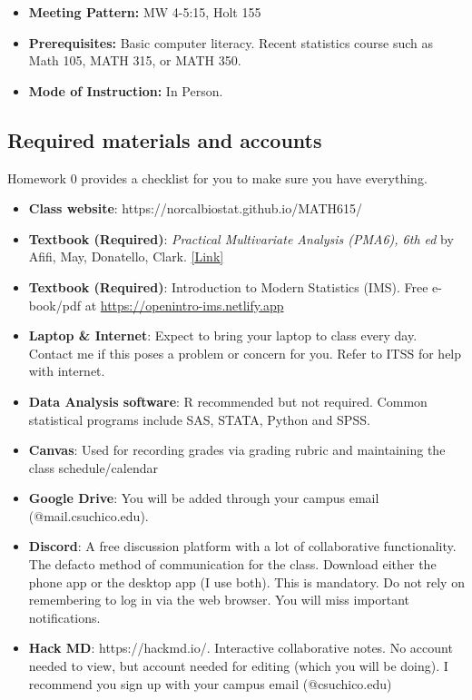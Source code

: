 \documentclass[
  letterpaper,
  DIV=11,
  numbers=noendperiod]{scrartcl}
\providecommand{\tightlist}{%
  \setlength{\itemsep}{0pt}\setlength{\parskip}{0pt}}\usepackage{longtable,booktabs,array}
\begin{document}
\begin{itemize}
\tightlist
\item
  \textbf{Meeting Pattern:} MW 4-5:15, Holt 155
\item
  \textbf{Prerequisites:} Basic computer literacy. Recent statistics
  course such as Math 105, MATH 315, or MATH 350.
\item
  \textbf{Mode of Instruction:} In Person.
\end{itemize}

\hypertarget{required-materials-and-accounts}{%
\subsection{Required materials and
accounts}\label{required-materials-and-accounts}}

Homework 0 provides a checklist for you to make sure you have
everything.

\begin{itemize}
\tightlist
\item
  \textbf{Class website}: https://norcalbiostat.github.io/MATH615/
\item
  \textbf{Textbook (Required)}: \emph{Practical Multivariate Analysis
  (PMA6), 6th ed} by Afifi, May, Donatello, Clark.
  \href{https://www.routledge.com/Practical-Multivariate-Analysis/Afifi-May-Donatello-Clark/p/book/9781032088471}{{[}Link{]}}
\item
  \textbf{Textbook (Required)}: Introduction to Modern Statistics (IMS).
  Free e-book/pdf at \url{https://openintro-ims.netlify.app}
\item
  \textbf{Laptop \& Internet}: Expect to bring your laptop to class
  every day. Contact me if this poses a problem or concern for you.
  Refer to ITSS for help with internet.
\item
  \textbf{Data Analysis software}: R recommended but not required.
  Common statistical programs include SAS, STATA, Python and SPSS.
\item
  \textbf{Canvas}: Used for recording grades via grading rubric and
  maintaining the class schedule/calendar
\item
  \textbf{Google Drive}: You will be added through your campus email
  (@mail.csuchico.edu).
\item
  \textbf{Discord}: A free discussion platform with a lot of
  collaborative functionality. The defacto method of communication for
  the class. Download either the phone app or the desktop app (I use
  both). This is mandatory. Do not rely on remembering to log in via the
  web browser. You will miss important notifications.
\item
  \textbf{Hack MD}: https://hackmd.io/. Interactive collaborative notes.
  No account needed to view, but account needed for editing (which you
  will be doing). I recommend you sign up with your campus email
  (@csuchico.edu)
\end{itemize}
\end{document}
